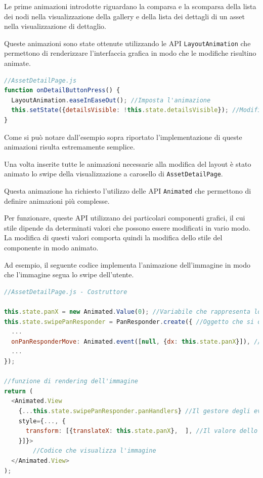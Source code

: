 Le prime animazioni introdotte riguardano la comparsa e la scomparsa della lista dei nodi nella visualizzazione della gallery e della lista dei dettagli di un asset nella visualizzazione di dettaglio.

Queste animazioni sono state ottenute utilizzando le API \texttt{LayoutAnimation} che permettono di renderizzare l'interfaccia grafica in modo che le modifiche risultino animate.

\begin{lstlisting}[language=JavaScript, caption=AssetDetailPage - Animazione della comparsa/scomparsa lista dei dettagli]
//AssetDetailPage.js
function onDetailButtonPress() {
  LayoutAnimation.easeInEaseOut(); //Imposta l'animazione
  this.setState({detailsVisible: !this.state.detailsVisible}); //Modifica lo stato del componente causandone il re-rendering
}
\end{lstlisting}

Come si può notare dall'esempio sopra riportato l'implementazione di queste animazioni risulta estremamente semplice.

Una volta inserite tutte le animazioni necessarie alla modifica del layout è stato animato lo swipe della visualizzazione a carosello di \texttt{AssetDetailPage}.

Questa animazione ha richiesto l'utilizzo delle API \texttt{Animated} che permettono di definire animazioni più complesse.

Per funzionare, queste API utilizzano dei particolari componenti grafici, il cui stile dipende da determinati valori che possono essere modificati in vario modo. La modifica di questi valori comporta quindi la modifica dello stile del componente in modo animato.

Ad esempio, il seguente codice implementa l'animazione dell'immagine in modo che l'immagine segua lo swipe dell'utente.

\begin{lstlisting}[language=JavaScript, caption=AssetDetailImage - Spostamento dell'immagine allo swipe delll'utente]
//AssetDetailPage.js - Costruttore

this.state.panX = new Animated.Value(0); //Variabile che rappresenta lo spostamento dell'immagine
this.state.swipePanResponder = PanResponder.create({ //Oggetto che si occupa di rilevare le gesture dell'utente
  ...
  onPanResponderMove: Animated.event([null, {dx: this.state.panX}]), //All'evento onPanResponderMove, che viene sollevato quando l'utente esegue un pan (equivalente del drag'n'drop nei dispositivi touchscreen) viene collegata la variabile panX, in modo che il valore della variabile venga modificato e che la modifica venga effettuata in modo animato
  ...
});

//funzione di rendering dell'immagine
return (
  <Animated.View
    {...this.state.swipePanResponder.panHandlers} //Il gestore degli eventi viene collegato alla View
    style={..., {
      transform: [{translateX: this.state.panX},  ], //Il valore dello spostamento viene associato allo stile della View, in particolare alla traslazione sull'asse X
    }]}>
    	//Codice che visualizza l'immagine
  </Animated.View>
);
\end{lstlisting}

